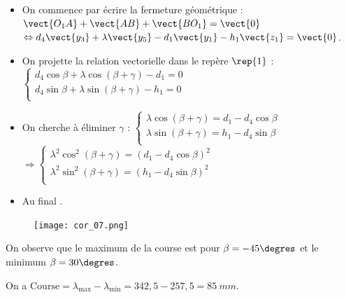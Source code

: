 \ifprof
\begin{corrige}
\begin{itemize}
\item On commence par écrire la fermeture géométrique : $\vect{O_1A}+\vect{AB}+\vect{BO_1} = \vect{0}$ 
$ \Leftrightarrow d_4\vect{y_3} +\lambda\vect{y_5} - d_1\vect{y_1}-h_1\vect{z_1} = \vect{0}$.
\item On projette la relation vectorielle dans le repère $\rep{1}$ :
$\left\{
\begin{array}{l}
d_4\cos\beta +\lambda\cos(\beta+\gamma) - d_1= {0}  \\
d_4\sin\beta +\lambda\sin(\beta+\gamma) - h_1= {0}  \\
\end{array}
\right.$
\item On cherche à éliminer $\gamma$ :
$\left\{
\begin{array}{l}
\lambda\cos(\beta+\gamma) =d_1 - d_4\cos\beta  \\
\lambda\sin(\beta+\gamma)  = h_1  - d_4\sin\beta \\
\end{array}
\right.$ 
$ \Rightarrow \left\{
\begin{array}{l}
\lambda^2\cos^2(\beta+\gamma) =\left(d_1 - d_4\cos\beta \right)^2 \\
\lambda^2\sin^2(\beta+\gamma)  =\left( h_1  - d_4\sin\beta\right)^2 \\
\end{array}
\right.$ 
\item Au final .
\end{itemize}
\end{corrige}
\else
\fi



\ifprof
\begin{corrige}
\begin{figure}[H]
\centering
\texttt{[image: cor\_07.png]}
\end{figure}
On observe que le maximum de la course est pour $\beta=-45\degres$ et le minimum $\beta=30\degres$.

On a $\text{Course} = \lambda_{\text{max}}-\lambda_{\text{min}} = 342,5 - 257,5 = \SI{85}{mm}$.
\end{corrige}
\else
\fi



